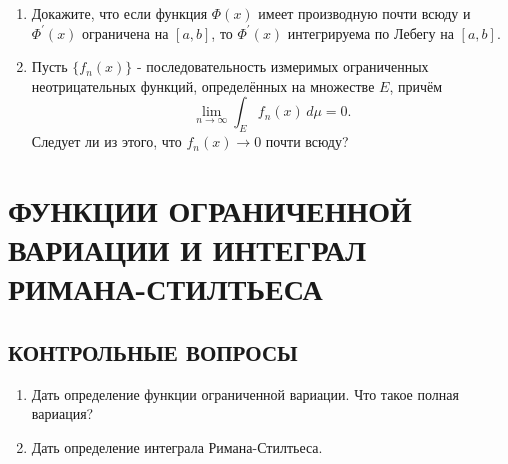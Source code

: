 \documentclass[12pt,a4paper]{article}
\begin{document}
\begin{enumerate}
\item Докажите, что если функция $\Phi(x)$ имеет производную почти всюду и $\Phi^{\prime}(x)$ ограничена на $[a,b]$, то $\Phi^{\prime}(x)$ интегрируема по Лебегу на $[a,b]$.

\item Пусть $\{f_{n}(x)\}$ - последовательность измеримых ограниченных неотрицательных функций, определённых на множестве $E$, причём
$$ \lim_{n \rightarrow \infty} \int_{E} f_{n}(x) \, d\mu = 0. $$
Следует ли из этого, что $f_{n}(x) \rightarrow 0$ почти всюду?
\end{enumerate}

\section{ФУНКЦИИ ОГРАНИЧЕННОЙ ВАРИАЦИИ И ИНТЕГРАЛ РИМАНА-СТИЛТЬЕСА}

\subsection*{КОНТРОЛЬНЫЕ ВОПРОСЫ}
\begin{enumerate}
\item Дать определение функции ограниченной вариации. Что такое полная вариация?
\item Дать определение интеграла Римана-Стилтьеса.
\end{enumerate}
\end{document}
